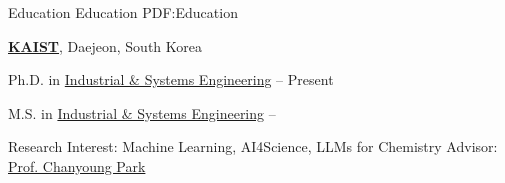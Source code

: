 \documentclass[letterpaper,MMMyyyy,nonstopmode]{simpleresumecv}
\begin{document}
\begin{Body}





\Section
{Education}
{Education}
{PDF:Education}

\Entry
\href{https://www.kaist.ac.kr/en/}
{\textbf{KAIST}},
Daejeon, South Korea

\Gap
\BulletItem
Ph.D. in
\href{https://statistics.kaist.ac.kr/}
{Industrial \& Systems Engineering}
\hfill
{} --
Present

\BulletItem
M.S. in
\href{https://statistics.kaist.ac.kr/}
{Industrial \& Systems Engineering}
\hfill
{} -- 
\begin{Detail}
\SubBulletItem
Research Interest:
{\footnotesize Machine Learning, AI4Science, LLMs for Chemistry}
\SubBulletItem
Advisor:
\href{http://dsail.kaist.ac.kr/professor/}
{Prof. Chanyoung Park}
\end{Detail}


\end{Body}
\end{document}
